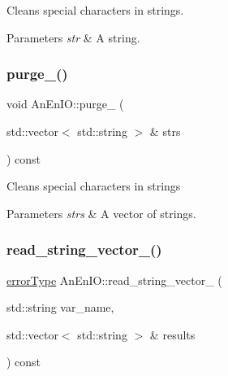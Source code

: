 Cleans special characters in strings.


\begin{DoxyParams}{Parameters}
{\em str} & A string. \\
\hline
\end{DoxyParams}
\mbox{\label{class_an_en_i_o_a7be5ab5c8c42fc9a04e4deeb0059a54d}} 
\subsubsection{\texorpdfstring{purge\+\_\+()}{purge\_()}\hspace{0.1cm}{\footnotesize\ttfamily [2/2]}}
{\footnotesize\ttfamily void An\+En\+I\+O\+::purge\+\_\+ (\begin{DoxyParamCaption}\item[{std\+::vector$<$ std\+::string $>$ \&}]{strs }\end{DoxyParamCaption}) const\hspace{0.3cm}{\ttfamily [protected]}}

Cleans special characters in strings


\begin{DoxyParams}{Parameters}
{\em strs} & A vector of strings. \\
\hline
\end{DoxyParams}
\mbox{\label{class_an_en_i_o_ae9cf0a8cde2b742992295ccc2bed17ef}} 
\subsubsection{\texorpdfstring{read\+\_\+string\+\_\+vector\+\_\+()}{read\_string\_vector\_()}\hspace{0.1cm}{\footnotesize\ttfamily [1/2]}}
{\footnotesize\ttfamily \mbox{\hyperlink{class_an_en_i_o_aa56bc1ec6610b86db4349bce20f9ead0}{error\+Type}} An\+En\+I\+O\+::read\+\_\+string\+\_\+vector\+\_\+ (\begin{DoxyParamCaption}\item[{std\+::string}]{var\+\_\+name,  }\item[{std\+::vector$<$ std\+::string $>$ \&}]{results }\end{DoxyParamCaption}) const\hspace{0.3cm}{\ttfamily [protected]}}

